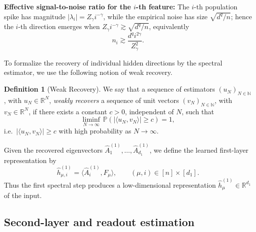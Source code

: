 \documentclass[]{article}
\numberwithin{equation}{section}
\theoremstyle{definition}
\newtheorem{definition}{Definition}[section]
\newcommand{\RR}{\mathbb{R}}
\newcommand{\NN}{\mathbb{N}}
\begin{document}
\textbf{Effective signal-to-noise ratio for the $i$-th feature:} The $i$-th population spike has magnitude $|\lambda_i|=Z_\gamma i^{-\gamma}$, while the empirical noise has size $\sqrt{d^q/n}$; hence the $i$-th direction emerges when $Z_\gamma i^{-\gamma}\gtrsim \sqrt{d^q/n}$, equivalently
\begin{equation}
    n_i \gtrsim \frac{d^q i^{2\gamma}}{Z_\gamma^2}.
    \label{eq:pred_sample_complexity}
\end{equation}

To formalize the recovery of individual hidden directions by the spectral estimator, we use the following notion of weak recovery.

\begin{definition}[Weak Recovery]
We say that a sequence of estimators $(u_N)_{N \in \NN}$, with $u_N \in \RR^{N}$, \emph{weakly recovers} a sequence of unit vectors $(v_N)_{N \in \NN}$, with $v_N \in \RR^{N}$, if there exists a constant $c > 0$, independent of $N$, such that
\[
\liminf_{N \to \infty}\, \mathbb{P}\!\left( \left|\langle u_N, v_N \rangle\right| \geq c \right) = 1,
\]
i.e.\ $|\langle u_N, v_N \rangle| \geq c$ with high probability as $N \to \infty$.
\end{definition}

Given the recovered eigenvectors $\widehat A^{(1)}_1,\ldots,\widehat A^{(1)}_{d_1}$, we define the learned first-layer representation by
\begin{equation}
    \widehat h^{(1)}_{\mu,i}
    =
    \langle \widehat A^{(1)}_i,F_{\mu}\rangle,
    \qquad
    (\mu,i)\in[n]\times[d_1].
    \label{eq:def_hhat_first_layer}
\end{equation}
Thus the first spectral step produces a low-dimensional representation $\widehat h^{(1)}_\mu\in\RR^{d_1}$ of the input.

\subsection{Second-layer and readout estimation}\label{subsec:est_2nd_layer}
\end{document}
